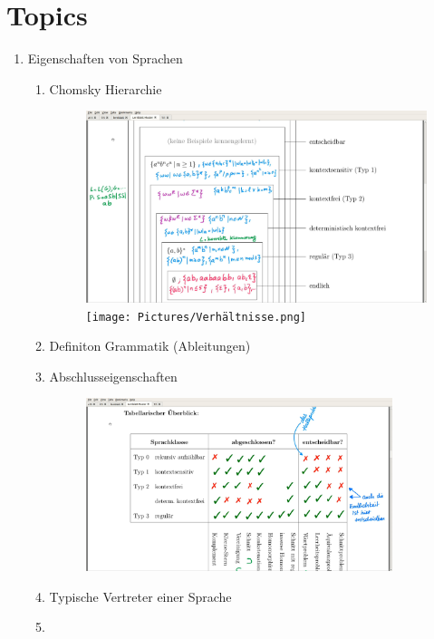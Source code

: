 \documentclass[12pt]{scrartcl}
\begin{document}
\section{Topics}
	\begin{enumerate}
	
	\item Eigenschaften von Sprachen
		\begin{enumerate}
			\item Chomsky Hierarchie 
				\begin{figure}[!h]
				\centering
				\includegraphics[width=1\textwidth]{Pictures/Chomsky.png}
				\texttt{[image: Pictures/Verhältnisse.png]}
				\end{figure}
			\item Definiton Grammatik (Ableitungen) 
			\item Abschlusseigenschaften
				\begin{figure}[!h]
				\centering
				\includegraphics[width=0.9\textwidth]{Pictures/Abschlusseigenschaften.png}
				\end{figure}
			\item Typische Vertreter einer Sprache
			\item 
		\end{enumerate}
		

\end{enumerate}
\end{document}
